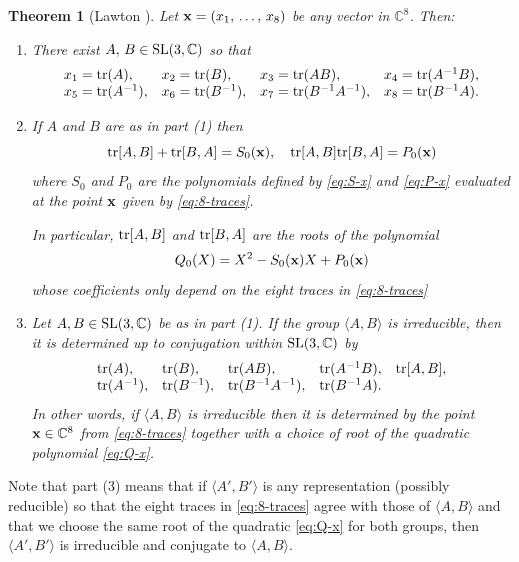 \documentclass[11pt]{amsart}
\newtheorem{theorem}{Theorem}[section]
\numberwithin{equation}{section}
\begin{document}
\begin{theorem}[Lawton \cite{Law}]\label{thm-lawton}
Let ${\bf x}=(x_1,\,\ldots,\, x_8)$ be any vector in ${\mathbb C}^8$. Then:
\begin{enumerate}
\item[(1)] 
There exist $A,\,B\in{\rm SL}(3,{\mathbb C})$ so that
\begin{equation}\label{eq:8-traces}
	\begin{array}{llll} x_1={\rm tr}(A),& x_2={\rm tr}(B),& x_3={\rm tr}(AB),& x_4={\rm tr}(A^{-1}B), \\
	x_5={\rm tr}(A^{-1}), & x_6={\rm tr}(B^{-1}), & x_7={\rm tr}(B^{-1}A^{-1}), & x_8={\rm tr}(B^{-1}A).
    \end{array}
\end{equation}
\item[(2)] If $A$ and $B$ are as in part (1) then 
$$
{\rm tr}[A,B]+{\rm tr}[B,A]=S_0({\bf x}),\quad {\rm tr}[A,B]{\rm tr}[B,A]=P_0({\bf x})
$$
where $S_0$ and $P_0$ are the polynomials defined by \eqref{eq:S-x} and \eqref{eq:P-x} evaluated
at the point ${\bf x}$ given by \eqref{eq:8-traces}. 

In particular, ${\rm tr}[A,B]$ and ${\rm tr}[B,A]$ are the roots of the polynomial
	\begin{equation}\label{eq:Q-x}
		Q_0(X)=X^2-S_0({\bf x})X+P_0({\bf x})
	\end{equation}
whose coefficients only depend on the eight traces in \eqref{eq:8-traces}
\item[(3)] Let $A,B\in {\rm SL}(3,\mathbb{C})$ be as in part (1). If the group $\langle A,B\rangle$ is irreducible, 
then it is determined up to conjugation within ${\rm SL}(3,\mathbb{C})$ by
	$$
	\begin{array}{lllll} {\rm tr}(A),& {\rm tr}(B),& {\rm tr}(AB),& {\rm tr}(A^{-1}B), & {\rm tr}[A,B], \\
	{\rm tr}(A^{-1}), & {\rm tr}(B^{-1}), & {\rm tr}(B^{-1}A^{-1}), & {\rm tr}(B^{-1}A).
    \end{array}
    $$
In other words, if $\langle A,B\rangle$ is irreducible then it is determined by the point ${\bf x}\in{\mathbb C}^8$
from \eqref{eq:8-traces} together with a choice of root of the quadratic polynomial \eqref{eq:Q-x}.
\end{enumerate}
\end{theorem}

Note that part (3) means that if $\langle A', B'\rangle$ is any representation (possibly reducible) so that the eight traces 
in \eqref{eq:8-traces} agree with those of $\langle A,B\rangle$ and that we choose the same root
of the quadratic \eqref{eq:Q-x} for both groups, then $\langle A',B'\rangle$ is irreducible and conjugate to $\langle A,B\rangle$.
\end{document}
